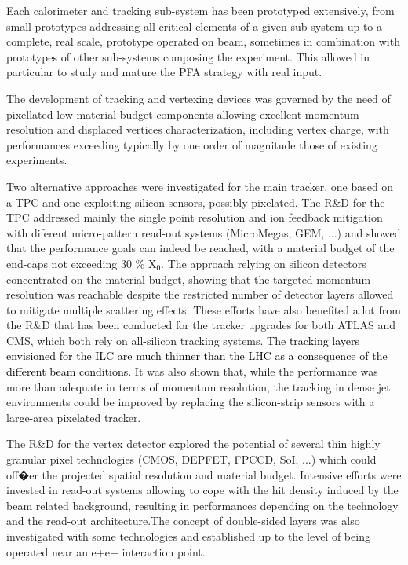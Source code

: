 \documentclass[%
 reprint,
 amsmath,amssymb,
 aps,
]{revtex4-1}
\newcommand{\jim}[1]{\textcolor{black}{#1}}
\begin{document}
Each calorimeter and tracking sub-system has been prototyped extensively, from small prototypes addressing all critical elements of a given sub-system up to a complete, real scale, prototype operated on beam, sometimes in combination with prototypes of other sub-systems composing the experiment. This allowed in particular to study and mature the PFA strategy with real input.

The development of tracking and vertexing devices was governed by the need of pixellated low material budget components allowing excellent momentum resolution and displaced vertices characterization, including vertex charge, with performances exceeding typically by one order of magnitude those of existing experiments.

Two alternative approaches were investigated for the main tracker, one based on a TPC and one exploiting silicon sensors, possibly pixelated. The R\&D for the TPC addressed mainly the single point resolution and ion feedback mitigation with diferent micro-pattern read-out systems (MicroMegas, GEM, ...) and showed that the performance goals can indeed be reached, with a material budget of the end-caps not exceeding 30 \% X\jim{$_0$}. The approach relying on silicon detectors concentrated on the material budget, showing that the targeted momentum resolution was reachable despite the restricted number of detector layers allowed to mitigate multiple scattering effects. These efforts have also benefited a lot from the R\&D that has been conducted for the tracker upgrades for both ATLAS and CMS, which both rely on all-silicon tracking systems. 
\jim{The tracking layers 
envisioned for the ILC are much thinner than the LHC as a consequence of the different beam conditions.}
It was also shown that, while the performance was more than adequate in terms of momentum resolution, the tracking in dense jet environments could be improved by replacing the silicon-strip sensors with a large-area pixelated tracker. 

The R\&D for the vertex detector explored the potential of several thin highly granular pixel technologies (CMOS, DEPFET, FPCCD, SoI, ...) which could off�er the projected spatial resolution and material budget. Intensive efforts were invested in read-out systems allowing to cope with the hit density induced by the beam related background, resulting in performances depending on the technology and the read-out architecture.The concept of double-sided layers was also investigated with some technologies and established up to the level of being operated near an e+e− interaction point.
\end{document}
